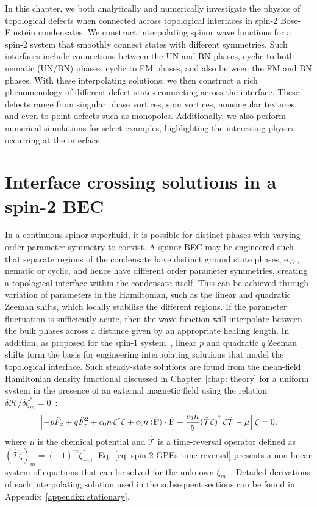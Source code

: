In this chapter, we both analytically and numerically investigate the physics
of topological defects when connected across topological interfaces in spin-2
Bose-Einstein condensates.
We construct interpolating spinor wave functions for a spin-2 system that
smoothly connect states with different symmetries.
Such interfaces include connections between the UN and BN phases, cyclic to both
nematic (UN/BN) phases, cyclic to FM phases, and also between the FM and BN
phases.
With these interpolating solutions, we then construct a rich phenomenology of
different defect states connecting across the interface.
These defects range from singular phase vortices, spin vortices, nonsingular
textures, and even to point defects such as monopoles.
Additionally, we also perform numerical simulations for select examples,
highlighting the interesting physics occurring at the interface.


\section{Interface crossing solutions in a spin-2 BEC}
In a continuous spinor superfluid, it is possible for distinct phases with
varying order parameter symmetry to coexist.
A spinor BEC may be engineered such that separate regions of the condensate
have distinct ground state phases, e.g., nematic or cyclic, and hence have
different order parameter symmetries, creating a topological interface within
the condensate itself.
This can be achieved through variation of parameters in the Hamiltonian, such as
the linear and quadratic Zeeman shifts, which locally stabilise the different
regions.
If the parameter fluctuation is sufficiently acute, then the wave function will
interpolate between the bulk phases across a distance given by an appropriate
healing length.
In addition, as proposed for the spin-1 system~\cite{Borgh2014}, linear \(p\)
and quadratic \(q\) Zeeman shifts form the basis for engineering interpolating
solutions that model the topological interface.
Such steady-state solutions are found from the mean-field Hamiltonian density
functional discussed in Chapter~\ref{chap: theory} for a uniform system in the
presence of an external magnetic field using the relation \(\delta \mathcal{H}
/ \delta \zeta_m^*=0\)~\cite{Kawaguchi2012}:
\begin{equation}\label{eq: spin-2-GPEs-time-reversal}
    \left[-p \hat{F}_z + q \hat{F}^2_z + c_0n \, \zeta^\dagger \zeta
        + c_1n \, \langle\hat{\vb{F}}\rangle\cdot\hat{\vb{F}}
        + \frac{c_2n}{5}{(\hat{\mathcal{T}}\zeta)}^\dagger \,
        \zeta\hat{\mathcal{T}} -\mu \right] \zeta = 0,
\end{equation}
where \(\mu \) is the chemical potential and \(\hat{\mathcal{T}}\) is a
time-reversal operator defined as \({(\hat{\mathcal{T}}\zeta)}_m =
{(-1)}^m\zeta_{-m}^*\).
Eq.~\eqref{eq: spin-2-GPEs-time-reversal} presents a non-linear system of
equations that can be solved for the unknown
\(\zeta_m\)~\cite{Ciobanu2000,Kawaguchi2012}.
Detailed derivations of each interpolating solution used in the subsequent
sections can be found in Appendix~\ref{appendix: stationary}.

